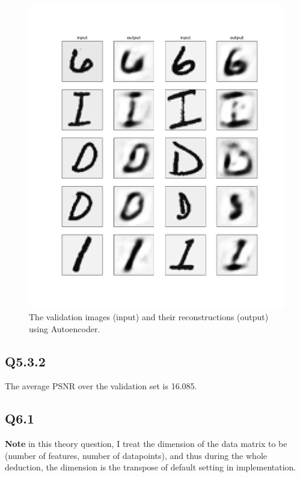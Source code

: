 \documentclass[11pt]{article}
\begin{document}
\begin{figure}[h!]
    \centering
    \includegraphics[width=.8\linewidth]{../results/q5_3_1.png}
    \caption{The validation images (input) and their reconstructions (output) using Autoencoder. }
    \label{fig:q5.3.1}
\end{figure}

\newpage

\subsection*{Q5.3.2}

The average PSNR over the validation set is 16.085.

\newpage

\subsection*{Q6.1}

\newcommand{\bX}{\mathbf{X}}
\newcommand{\bA}{\mathbf{A}}
\newcommand{\bC}{\mathbf{C}}
\newcommand{\bU}{\mathbf{U}}
\newcommand{\bu}{\mathbf{u}}
\newcommand{\bV}{\mathbf{V}}
\newcommand{\bv}{\mathbf{v}}
\newcommand{\bS}{\mathbf{S}}
\newcommand{\bP}{\mathbf{P}}

\textbf{Note} in this theory question, I treat the dimension of the data matrix to be (number of features, number of datapoints), and thus during the whole deduction, the dimension is the transpose of default setting in implementation.
\end{document}
